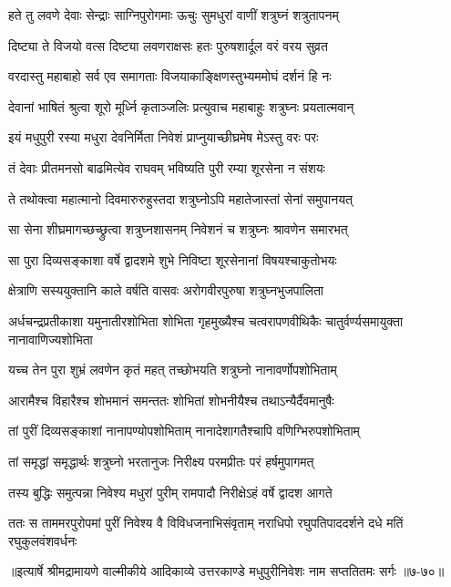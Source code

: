 
\twolineshloka
{हते तु लवणे देवाः सेन्द्राः साग्निपुरोगमाः}
{ऊचुः सुमधुरां वाणीं शत्रुघ्नं शत्रुतापनम्} %

\twolineshloka
{दिष्ट्या ते विजयो वत्स दिष्ट्या लवणराक्षसः}
{हतः पुरुषशार्दूल वरं वरय सुव्रत} %

\twolineshloka
{वरदास्तु महाबाहो सर्व एव समागताः}
{विजयाकाङ्क्षिणस्तुभ्यममोघं दर्शनं हि नः} %

\twolineshloka
{देवानां भाषितं श्रुत्वा शूरो मूर्ध्नि कृताञ्जलिः}
{प्रत्युवाच महाबाहुः शत्रुघ्नः प्रयतात्मवान्} %

\twolineshloka
{इयं मधुपुरी रस्या मधुरा देवनिर्मिता}
{निवेशं प्राप्नुयाच्छीघ्रमेष मेऽस्तु वरः परः} %

\twolineshloka
{तं देवाः प्रीतमनसो बाढमित्येव राघवम्}
{भविष्यति पुरी रम्या शूरसेना न संशयः} %

\twolineshloka
{ते तथोक्त्वा महात्मानो दिवमारुरुहुस्तदा}
{शत्रुघ्नोऽपि महातेजास्तां सेनां समुपानयत्} %

\twolineshloka
{सा सेना शीघ्रमागच्छच्छ्रुत्वा शत्रुघ्नशासनम्}
{निवेशनं च शत्रुघ्नः श्रावणेन समारभत्} %

\twolineshloka
{सा पुरा दिव्यसङ्काशा वर्षे द्वादशमे शुभे}
{निविष्टा शूरसेनानां विषयश्चाकुतोभयः} %

\twolineshloka
{क्षेत्राणि सस्ययुक्तानि काले वर्षति वासवः}
{अरोगवीरपुरुषा शत्रुघ्नभुजपालिता} %

\threelineshloka
{अर्धचन्द्रप्रतीकाशा यमुनातीरशोभिता}
{शोभिता गृहमुख्यैश्च चत्वरापणवीथिकैः}
{चातुर्वर्ण्यसमायुक्ता नानावाणिज्यशोभिता} %

\twolineshloka
{यच्च तेन पुरा शुभ्रं लवणेन कृतं महत्}
{तच्छोभयति शत्रुघ्नो नानावर्णोपशोभिताम्} %

\twolineshloka
{आरामैश्च विहारैश्च शोभमानं समन्ततः}
{शोभितां शोभनीयैश्च तथाऽन्यैर्दैवमानुषैः} %

\twolineshloka
{तां पुरीं दिव्यसङ्काशां नानापण्योपशोभिताम्}
{नानादेशागतैश्चापि वणिग्भिरुपशोभिताम्} %

\twolineshloka
{तां समृद्धां समृद्धार्थः शत्रुघ्नो भरतानुजः}
{निरीक्ष्य परमप्रीतः परं हर्षमुपागमत्} %

\twolineshloka
{तस्य बुद्धिः समुत्पन्ना निवेश्य मधुरां पुरीम्}
{रामपादौ निरीक्षेऽहं वर्षे द्वादश आगते} %

\twolineshloka
{ततः स ताममरपुरोपमां पुरीं निवेश्य वै विविधजनाभिसंवृताम्}
{नराधिपो रघुपतिपाददर्शने दधे मतिं रघुकुलवंशवर्धनः} %


॥इत्यार्षे श्रीमद्रामायणे वाल्मीकीये आदिकाव्ये उत्तरकाण्डे मधुपुरीनिवेशः नाम सप्ततितमः सर्गः ॥७-७०॥

